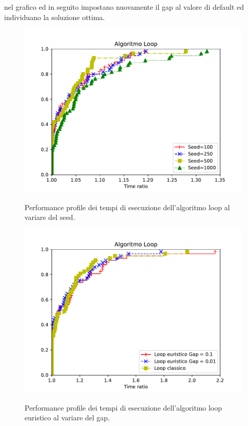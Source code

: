 nel grafico ed in seguito impostano nuovamente il gap al valore di default ed individuano la soluzione ottima.
\begin{figure}[H] 
\begin{center} 
  \includegraphics[scale=0.7]{Images/pp_random_seed}\\ 
  \caption{\footnotesize{Performance profile dei tempi di esecuzione dell'algoritmo loop al variare del seed.}}
  \label{pp_random_seed} 
\end{center} 
\end{figure}
\begin{figure}[H] 
\begin{center} 
  \includegraphics[scale=0.7]{Images/pp_gap}\\ 
  \caption{\footnotesize{Performance profile dei tempi di esecuzione dell'algoritmo loop euristico al variare del gap.}}
  \label{pp_gap} 
\end{center} 
\end{figure}

